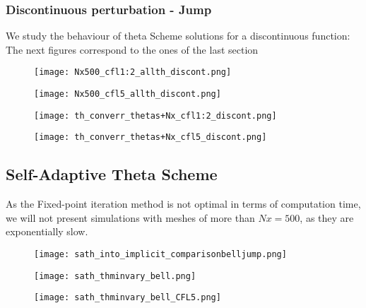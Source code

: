 \documentclass[12pt]{article}
\begin{document}
\subsubsection*{Discontinuous perturbation - Jump}
We study the behaviour of theta Scheme solutions for a discontinuous function:
The next figures correspond to the ones of the last section

\begin{figure}[H]
    \centering
    \texttt{[image: Nx500\_cfl1:2\_allth\_discont.png]}
    \caption{}
\end{figure}

\begin{figure}[H]
    \centering
    \texttt{[image: Nx500\_cfl5\_allth\_discont.png]}
    \caption{}
\end{figure}

\begin{figure}[H]
    \centering
    \texttt{[image: th\_converr\_thetas+Nx\_cfl1:2\_discont.png]}
    \caption{}
\end{figure}

\begin{figure}[H]
    \centering
    \texttt{[image: th\_converr\_thetas+Nx\_cfl5\_discont.png]}
    \caption{}
\end{figure}


\subsection*{Self-Adaptive Theta Scheme}
As the Fixed-point iteration method is not optimal in terms of computation time, we will not present simulations with meshes of more than $Nx=500$, as they are exponentially slow.

\begin{figure}[H]
    \centering
    \texttt{[image: sath\_into\_implicit\_comparisonbelljump.png]}
    \caption{}
\end{figure}

\begin{figure}[H]
    \centering
    \texttt{[image: sath\_thminvary\_bell.png]}
    \caption{}
\end{figure}

\begin{figure}[H]
    \centering
    \texttt{[image: sath\_thminvary\_bell\_CFL5.png]}
    \caption{}
\end{figure}
\end{document}
